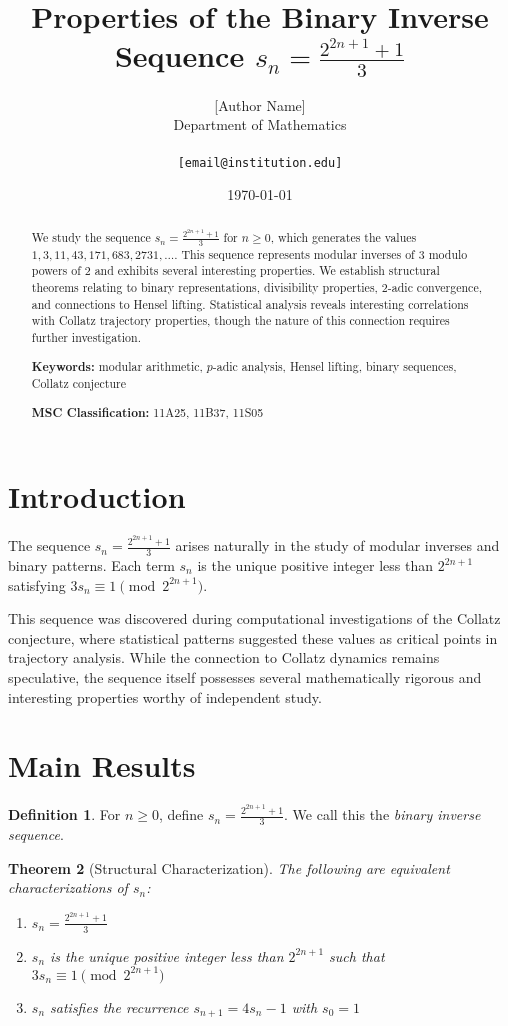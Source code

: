 \documentclass[11pt]{article}
\title{Properties of the Binary Inverse Sequence $s_n = \frac{2^{2n+1} + 1}{3}$}
\author{[Author Name]\\
Department of Mathematics\\
[Institution]\\
\texttt{[email@institution.edu]}
}
\date{\today}
\newtheorem{theorem}{Theorem}[section]
\theoremstyle{definition}
\newtheorem{definition}[theorem]{Definition}
\begin{document}
\maketitle

\begin{abstract}
We study the sequence $s_n = \frac{2^{2n+1} + 1}{3}$ for $n \geq 0$, which generates the values $1, 3, 11, 43, 171, 683, 2731, \ldots$. This sequence represents modular inverses of $3$ modulo powers of $2$ and exhibits several interesting properties. We establish structural theorems relating to binary representations, divisibility properties, $2$-adic convergence, and connections to Hensel lifting. Statistical analysis reveals interesting correlations with Collatz trajectory properties, though the nature of this connection requires further investigation.

\textbf{Keywords:} modular arithmetic, $p$-adic analysis, Hensel lifting, binary sequences, Collatz conjecture

\textbf{MSC Classification:} 11A25, 11B37, 11S05
\end{abstract}

\section{Introduction}

The sequence $s_n = \frac{2^{2n+1} + 1}{3}$ arises naturally in the study of modular inverses and binary patterns. Each term $s_n$ is the unique positive integer less than $2^{2n+1}$ satisfying $3s_n \equiv 1 \pmod{2^{2n+1}}$.

This sequence was discovered during computational investigations of the Collatz conjecture, where statistical patterns suggested these values as critical points in trajectory analysis. While the connection to Collatz dynamics remains speculative, the sequence itself possesses several mathematically rigorous and interesting properties worthy of independent study.

\section{Main Results}

\begin{definition}\label{def:binary-inverse}
For $n \geq 0$, define $s_n = \frac{2^{2n+1} + 1}{3}$. We call this the \emph{binary inverse sequence}.
\end{definition}

\begin{theorem}[Structural Characterization]\label{thm:structural}
The following are equivalent characterizations of $s_n$:
\begin{enumerate}
\item $s_n = \frac{2^{2n+1} + 1}{3}$
\item $s_n$ is the unique positive integer less than $2^{2n+1}$ such that $3s_n \equiv 1 \pmod{2^{2n+1}}$
\item $s_n$ satisfies the recurrence $s_{n+1} = 4s_n - 1$ with $s_0 = 1$
\end{enumerate}
\end{theorem}
\end{document}
